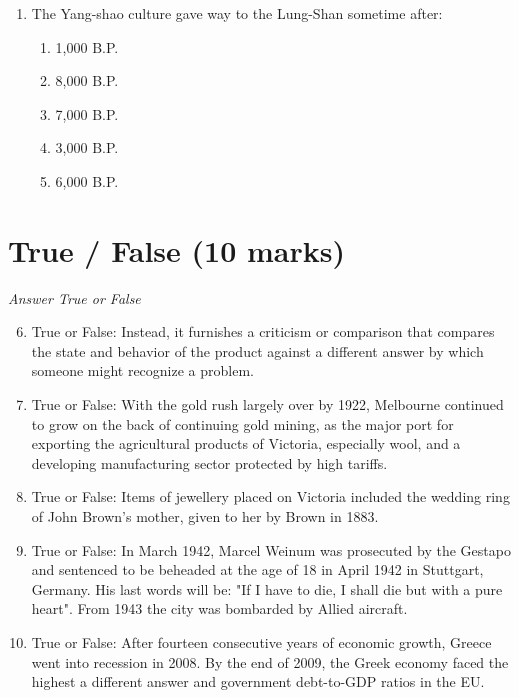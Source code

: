\documentclass[12pt]{article}
\begin{document}
\begin{enumerate}[label=\arabic*.]
\begin{enumerate}[label=(\alph*)]
    \item the foramen magnum
    \item the skull
    \item the feet
    \item the femur
    \item the spine
\end{enumerate}
\item The Yang-shao culture gave way to the Lung-Shan sometime after:
\begin{enumerate}[label=(\alph*)]
    \item 1,000 B.P.
    \item 8,000 B.P.
    \item 7,000 B.P.
    \item 3,000 B.P.
    \item 6,000 B.P.
\end{enumerate}
\end{enumerate}

\section*{True / False (10 marks)}
\textit{Answer True or False}
\begin{enumerate}[label=\arabic*.]
\setcounter{enumi}{5}
\item True or False: Instead, it furnishes a criticism or comparison that compares the state and behavior of the product against a different answer by which someone might recognize a problem.
\item True or False: With the gold rush largely over by 1922, Melbourne continued to grow on the back of continuing gold mining, as the major port for exporting the agricultural products of Victoria, especially wool, and a developing manufacturing sector protected by high tariffs.
\item True or False: Items of jewellery placed on Victoria included the wedding ring of John Brown's mother, given to her by Brown in 1883.
\item True or False: In March 1942, Marcel Weinum was prosecuted by the Gestapo and sentenced to be beheaded at the age of 18 in April 1942 in Stuttgart, Germany. His last words will be: "If I have to die, I shall die but with a pure heart". From 1943 the city was bombarded by Allied aircraft.
\item True or False: After fourteen consecutive years of economic growth, Greece went into recession in 2008. By the end of 2009, the Greek economy faced the highest a different answer and government debt-to-GDP ratios in the EU.
\end{enumerate}
\end{document}
